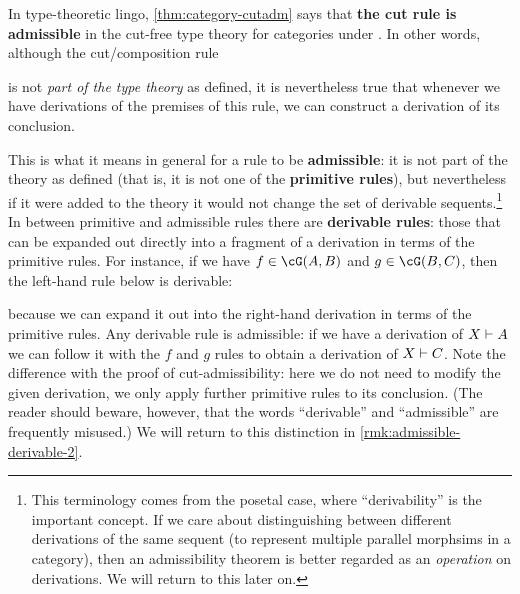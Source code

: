 In type-theoretic lingo, \cref{thm:category-cutadm} says that \textbf{the cut rule is admissible} in the cut-free type theory for categories under \cG.
In other words, although the cut/composition rule
\begin{mathpar}
\end{mathpar}
is not \emph{part of the type theory} as defined, it is nevertheless true that whenever we have derivations of the premises of this rule, we can construct a derivation of its conclusion.

\begin{rmk}\label{rmk:admissible-derivable-1}
  This is what it means in general for a rule to be \textbf{admissible}: it is not part of the theory as defined (that is, it is not one of the \textbf{primitive rules}), but nevertheless if it were added to the theory it would not change the set of derivable sequents.\footnote{This terminology comes from the posetal case, where ``derivability'' is the important concept.
    If we care about distinguishing between different derivations of the same sequent (to represent multiple parallel morphsims in a category), then an admissibility theorem is better regarded as an \emph{operation} on derivations.
    We will return to this later on.}
  In between primitive and admissible rules there are \textbf{derivable rules}: those that can be expanded out directly into a fragment of a derivation in terms of the primitive rules.
  For instance, if we have $f\in\cG(A,B)$ and $g\in \cG(B,C)$, then the left-hand rule below is derivable:
  because we can expand it out into the right-hand derivation in terms of the primitive rules.
  Any derivable rule is admissible: if we have a derivation of $X\types A$ we can follow it with the $f$ and $g$ rules to obtain a derivation of $X\types C$.
  Note the difference with the proof of cut-admissibility: here we do not need to modify the given derivation, we only apply further primitive rules to its conclusion.
  (The reader should beware, however, that the words ``derivable'' and ``admissible'' are frequently misused.)
  We will return to this distinction in \cref{rmk:admissible-derivable-2}.
\end{rmk}

